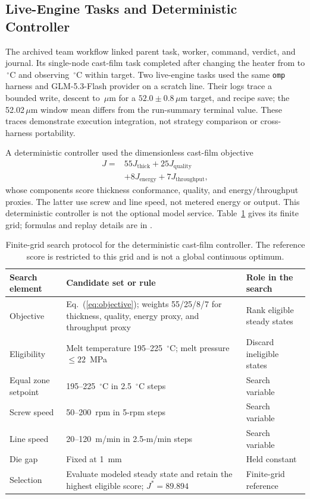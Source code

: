 \subsection{Live-Engine Tasks and Deterministic Controller}
\label{sec:agentteam}
The archived team workflow linked parent task, worker, command, verdict, and
journal. Its single-node cast-film task completed after changing the heater
from \resMissionFrom{} to \resMissionTo\,$^{\circ}$C and observing
\resMissionPv\,$^{\circ}$C within target. Two live-engine tasks used the
same \texttt{omp} harness and GLM-5.3-Flash provider on a scratch line. Their
logs trace a bounded write, descent to \resGoalFinal\,$\mu$m for a
$52.0\pm0.8$\,$\mu$m target, and recipe save; the 52.02\,$\mu$m window
mean differs from the run-summary terminal value. These traces demonstrate
execution integration, not strategy comparison or cross-harness portability.

\label{sec:controller}
A deterministic controller used the dimensionless cast-film objective
\begin{equation}
\begin{aligned}
J={}&55J_{\mathrm{thick}}+25J_{\mathrm{quality}}\\
&+8J_{\mathrm{energy}}+7J_{\mathrm{throughput}},
\end{aligned}
\label{eq:objective}
\end{equation}
whose components score thickness conformance, quality, and energy/throughput
proxies. The latter use screw and line speed, not metered energy or output.
This deterministic controller is not the optional model service.
Table~\ref{tab:q3search} gives its finite grid; formulas and replay details
are in .

\begin{table}[!t]
\centering
\caption{Finite-grid search protocol for the deterministic cast-film
controller. The reference score is restricted to this grid and is not
a global continuous optimum.}
\label{tab:q3search}
\footnotesize
\setlength{\tabcolsep}{4pt}
\begin{tabularx}{\textwidth}{@{}p{2.4cm}Xp{3.0cm}@{}}
\toprule
Search element & Candidate set or rule & Role in the search \\
\midrule
Objective & Eq.~(\ref{eq:objective}); weights 55/25/8/7 for thickness,
quality, energy proxy, and throughput proxy & Rank eligible steady states \\
Eligibility & Melt temperature 195--225~$^{\circ}$C; melt pressure
$\leq 22$~MPa & Discard ineligible states \\
Equal zone setpoint & 195--225~$^{\circ}$C in 2.5~$^{\circ}$C steps & Search variable \\
Screw speed & 50--200~rpm in 5-rpm steps & Search variable \\
Line speed & 20--120~m/min in 2.5-m/min steps & Search variable \\
Die gap & Fixed at 1~mm & Held constant \\
Selection & Evaluate modeled steady state and retain the highest eligible
score; $J^{*}=89.894$ & Finite-grid reference \\
\bottomrule
\end{tabularx}
\end{table}

